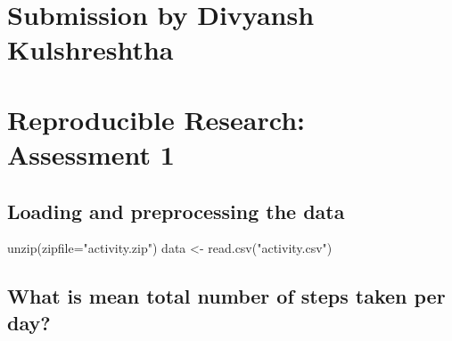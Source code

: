 \documentclass[
]{article}
\author{}
\date{\vspace{-2.5em}}
\newenvironment{Shaded}{\begin{snugshade}}{\end{snugshade}}
\newcommand{\AttributeTok}[1]{\textcolor[rgb]{0.77,0.63,0.00}{#1}}
\newcommand{\FunctionTok}[1]{\textcolor[rgb]{0.00,0.00,0.00}{#1}}
\newcommand{\NormalTok}[1]{#1}
\newcommand{\OtherTok}[1]{\textcolor[rgb]{0.56,0.35,0.01}{#1}}
\newcommand{\StringTok}[1]{\textcolor[rgb]{0.31,0.60,0.02}{#1}}
\begin{document}
\hypertarget{submission-by-divyansh-kulshreshtha}{%
\section{Submission by Divyansh
Kulshreshtha}\label{submission-by-divyansh-kulshreshtha}}

\hypertarget{reproducible-research-assessment-1}{%
\section{Reproducible Research: Assessment
1}\label{reproducible-research-assessment-1}}

\hypertarget{loading-and-preprocessing-the-data}{%
\subsection{Loading and preprocessing the
data}\label{loading-and-preprocessing-the-data}}

\begin{Shaded}
\begin{Highlighting}[]
\FunctionTok{unzip}\NormalTok{(}\AttributeTok{zipfile=}\StringTok{"activity.zip"}\NormalTok{)}
\NormalTok{data }\OtherTok{\textless{}{-}} \FunctionTok{read.csv}\NormalTok{(}\StringTok{"activity.csv"}\NormalTok{)}
\end{Highlighting}
\end{Shaded}

\hypertarget{what-is-mean-total-number-of-steps-taken-per-day}{%
\subsection{What is mean total number of steps taken per
day?}\label{what-is-mean-total-number-of-steps-taken-per-day}}
\end{document}
